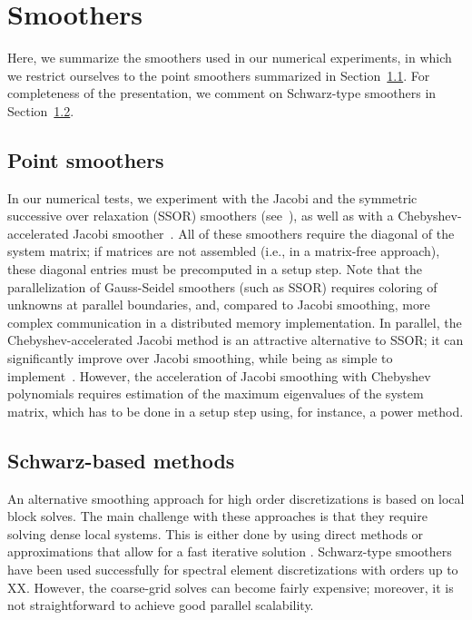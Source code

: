 \documentclass[smallcondensed,final]{svjour3}     %
\begin{document}



\section{Smoothers}
Here, we summarize the smoothers used in our numerical experiments, in
which we restrict ourselves to the point smoothers summarized in
Section~\ref{subsec:ptsmoothers}. For completeness of the
presentation, we comment on Schwarz-type smoothers in
Section~\ref{subsec:schwarz}.


\subsection{Point smoothers}\label{subsec:ptsmoothers}
In our numerical tests, we experiment with the Jacobi and the
symmetric successive over relaxation (SSOR) smoothers
(see~\cite{TrottenbergOosterleeSchuller01}), as well as with a
Chebyshev-accelerated Jacobi smoother~\cite{....}. All of these
smoothers require the diagonal of the system matrix; if matrices are
not assembled (i.e., in a matrix-free approach), these diagonal
entries must be precomputed in a setup step.  Note that the
parallelization of Gauss-Seidel smoothers (such as SSOR) requires
coloring of unknowns at parallel boundaries, and, compared to Jacobi
smoothing, more complex communication in a distributed memory
implementation. In parallel, the Chebyshev-accelerated Jacobi method
is an attractive alternative to SSOR; it can significantly improve
over Jacobi smoothing, while being as simple to
implement~\cite{AdamsBrezinaHuEtAl03}. However, the acceleration of
Jacobi smoothing with Chebyshev polynomials requires estimation of the
maximum eigenvalues of the system matrix, which has to be done in a
setup step using, for instance, a power method.




\subsection{Schwarz-based methods}\label{subsec:schwarz}
An alternative smoothing approach for high order discretizations is
based on local block solves.  The main challenge with these approaches
is that they require solving dense local systems.  This is either done
by using direct methods or approximations that allow for a fast
iterative solution
\cite{LottesFischer05,FischerLottes05}. Schwarz-type smoothers have
been used successfully for spectral element discretizations with
orders up to XX. However, the coarse-grid solves can become fairly
expensive; moreover, it is not straightforward to achieve good
parallel scalability.
\end{document}
